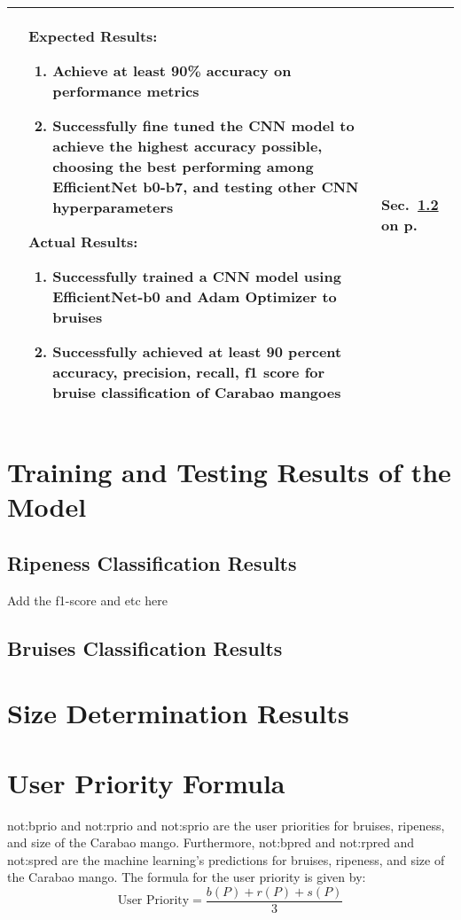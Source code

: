 \begin{center}
{\begin{tabularx}{\textwidth}{p{}|p{}|p{}}
			\Paste{SO7} & 
			Expected Results:
			\begin{enumerate}
				\item Achieve at least 90\% accuracy on performance metrics
				\item Successfully fine tuned the CNN model to achieve the highest accuracy possible, choosing the best performing among EfficientNet b0-b7, and testing other CNN hyperparameters
			\end{enumerate} 
			Actual Results:
			\begin{enumerate}
				\item Successfully trained a CNN model using EfficientNet-b0 and Adam Optimizer to bruises 
				\item Successfully achieved at least 90 percent accuracy, precision, recall, f1 score for bruise classification of Carabao mangoes
			\end{enumerate}
			 & Sec.~\ref{sec:bruisesClassificationResults} on p.~\pageref{sec:bruisesClassificationResults} \\ \hline
			
		\end{tabularx}
	}
\end{center}

\section{Training and Testing Results of the Model} \label{sec:main_trainAndTestResults}

\subsection{Ripeness Classification Results} \label{sec:ripenessClassificationResults}
Add the f1-score and etc here

\subsection{Bruises Classification Results} \label{sec:bruisesClassificationResults}

\section{Size Determination Results} \label{sec:sizeDeterminationResults}

\section{User Priority Formula} \label{sec:userPriorityFormula}
\gls{not:bprio} and \gls{not:rprio} and \gls{not:sprio} are the user priorities for bruises, ripeness, and size of the Carabao mango. 
Furthermore, \gls{not:bpred} and \gls{not:rpred} and \gls{not:spred} are the machine learning's predictions for bruises, ripeness, and size of the Carabao mango.
The formula for the user priority is given by:
\begin{equation}
	\label{eq:userPriority}
	\text{User Priority} = \frac{b \left( P \right) + r \left( P \right) + s \left( P \right)}{3}
\end{equation}
